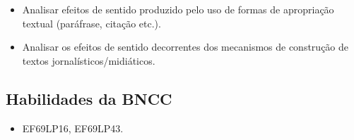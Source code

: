 \begin{itemize}
  
  \item Analisar efeitos de sentido produzido pelo uso de formas de apropriação 
  textual (paráfrase, citação etc.).
  
  \item Analisar os efeitos de sentido decorrentes dos mecanismos de construção 
  de textos jornalísticos/midiáticos.

\end{itemize}


\subsection{Habilidades da BNCC}

\begin{itemize}

  \item EF69LP16, EF69LP43.

\end{itemize}

